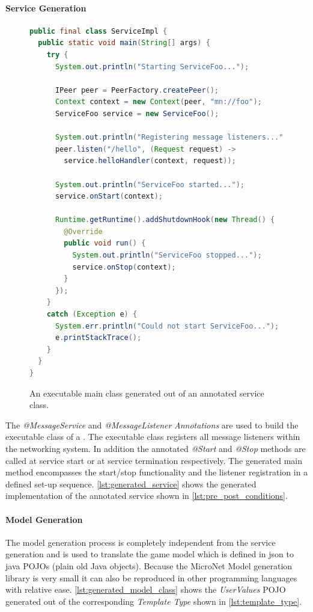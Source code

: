 \paragraph{Service Generation}

\begin{figure}
\begin{lstlisting}[language=Java,firstnumber=1] 
public final class ServiceImpl {
  public static void main(String[] args) {
    try {
      System.out.println("Starting ServiceFoo...");

      IPeer peer = PeerFactory.createPeer();
      Context context = new Context(peer, "mn://foo");
      ServiceFoo service = new ServiceFoo();

      System.out.println("Registering message listeners...");
      peer.listen("/hello", (Request request) -> 
      	service.helloHandler(context, request));

      System.out.println("ServiceFoo started...");
      service.onStart(context);

      Runtime.getRuntime().addShutdownHook(new Thread() {
        @Override
        public void run() {
          System.out.println("ServiceFoo stopped...");
          service.onStop(context);
        }
      });
    }
    catch (Exception e) {
      System.err.println("Could not start ServiceFoo...");
      e.printStackTrace();
    }
  }
}
\end{lstlisting}
\caption{An executable \ms{} main class generated out of an annotated service
class.}
\label{lst:generated_service}
\end{figure}

The \textit{@MessageService} and \textit{@MessageListener} \textit{Annotations}
are used to build the executable class of a \ms{}. The executable class
registers all message listeners within the networking system. In addition the
annotated \textit{@Start} and \textit{@Stop} methods are called at service start
or at service termination respectively. The generated main method encompasses
the start/stop functionality and the listener registration in a defined set-up
sequence. \autoref{lst:generated_service} shows the generated implementation of
the annotated service shown in \autoref{lst:pre_post_conditions}.


\paragraph{Model Generation}

The model generation process is completely independent from the service
generation and is used to translate the game model which is defined in
\gls{json} to java POJOs (plain old Java objects). Because the MicroNet Model
generation library is very small it can also be reproduced in other programming
languages with relative ease. \autoref{lst:generated_model_class} shows the
\textit{UserValues} POJO generated out of the corresponding \textit{Template Type}
shown in \autoref{lst:template_type}.

